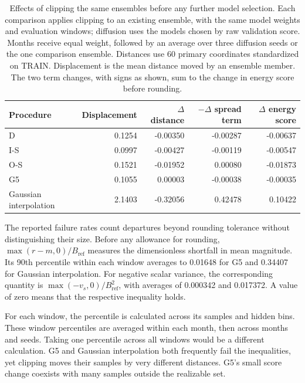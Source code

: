 \documentclass{article}
\begin{document}
\begin{table}[ht]
\centering
\caption{Effects of clipping the same ensembles before any further model selection. Each comparison applies clipping to an existing ensemble, with the same model weights and evaluation windows; diffusion uses the models chosen by raw validation score. Months receive equal weight, followed by an average over three diffusion seeds or the one comparison ensemble. Distances use 60 primary coordinates standardized on TRAIN. Displacement is the mean distance moved by an ensemble member. The two term changes, with signs as shown, sum to the change in energy score before rounding.}
\label{tab:operators}
\begin{tabular}{lrrrr}
\toprule
Procedure & Displacement & $\Delta$ distance & $-\Delta$ spread term & $\Delta$ energy score \\
\midrule
D & 0.1254 & -0.00350 & -0.00287 & -0.00637 \\
I-S & 0.0997 & -0.00427 & -0.00119 & -0.00547 \\
O-S & 0.1521 & -0.01952 & 0.00080 & -0.01873 \\
G5 & 0.1055 & 0.00003 & -0.00038 & -0.00035 \\
Gaussian interpolation & 2.1403 & -0.32056 & 0.42478 & 0.10422 \\
\bottomrule
\end{tabular}
\end{table}

\begin{samepage}
The reported failure rates count departures beyond rounding tolerance without distinguishing their size. Before any allowance for rounding, $\max(r-m,0)/B_{\mathrm{ref}}$ measures the dimensionless shortfall in mean magnitude. Its 90th percentile within each window averages to 0.01648 for G5 and 0.34407 for Gaussian interpolation. For negative scalar variance, the corresponding quantity is $\max(-v_s,0)/B_{\mathrm{ref}}^2$, with averages of 0.000342 and 0.017372. A value of zero means that the respective inequality holds.

For each window, the percentile is calculated across its samples and hidden bins. These window percentiles are averaged within each month, then across months and seeds. Taking one percentile across all windows would be a different calculation. G5 and Gaussian interpolation both frequently fail the inequalities, yet clipping moves their samples by very different distances. G5's small score change coexists with many samples outside the realizable set.

\end{samepage}
\end{document}
